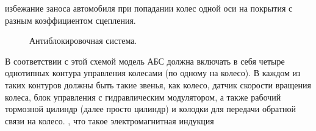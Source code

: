 избежание заноса автомобиля при попадании колес одной оси на покрытия с разным
коэффициентом сцепления.
\begin{figure}
	\centering
  \caption{Антиблокировочная система.}
  \label{abs_img}
\end{figure}
\par
В соответствии с этой схемой модель АБС должна включать в себя четыре однотипных
контура управления колесами (по одному на колесо). В каждом из таких контуров
должны быть такие звенья, как колесо, датчик скорости вращения колеса, блок
управления с гидравлическим модулятором, а также рабочий тормозной цилиндр
(далее просто цилиндр) и колодки для передачи обратной связи на колесо.
{, что такое электромагнитная индукция}\par
